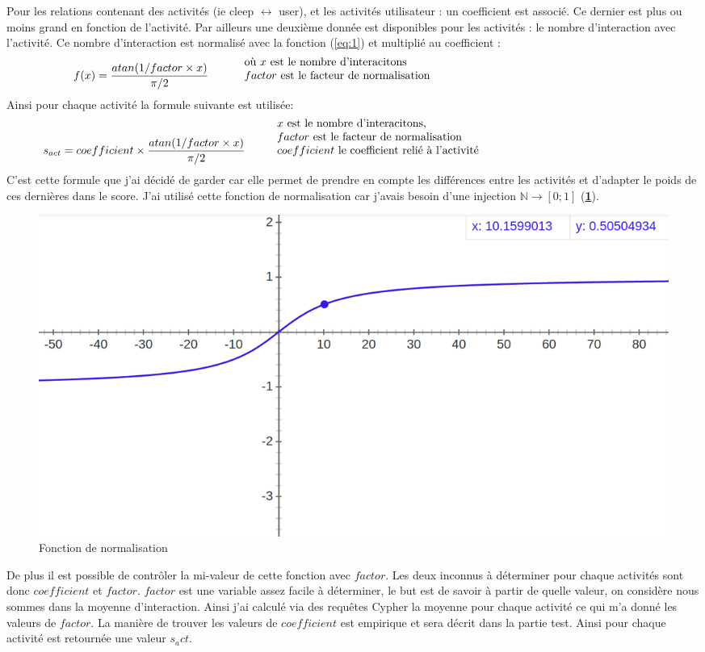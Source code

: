 \documentclass{article} %
\begin{document}
Pour les relations contenant des activités (ie cleep $\leftrightarrow$ user), et les activités utilisateur : un coefficient est associé. Ce dernier est plus ou moins grand en fonction de l'activité. Par ailleurs une deuxième donnée est disponibles pour les activités : le nombre d'interaction avec l'activité. Ce nombre d'interaction est normalisé avec la fonction (\ref{eq:1}) et multiplié au coefficient :
\begin{equation}
\label{eq:1}
f(x) = \frac{atan(1/factor \times x)}{\pi/2} \hspace{1cm} \mbox{ \vbox{\noindent où $x$ est le nombre d'interacitons \\$factor$ est le facteur de normalisation }}
\end{equation}
Ainsi pour chaque activité la formule suivante est utilisée:
\begin{equation}
\label{eq:2}
s_{act} = coefficient\times\frac{atan(1/factor \times x)}{\pi/2} \hspace{1cm} \mbox{\vbox{\noindent $x$ est le nombre d'interacitons, \\$factor$ est le facteur de  normalisation \\ $coefficient$ le coefficient relié à l'activité}} 
\end{equation}
C'est cette formule que j'ai décidé de garder car elle permet de prendre en compte les différences entre les activités et d'adapter le poids de ces dernières dans le score. J'ai utilisé cette fonction de normalisation car j'avais besoin d'une injection $\mathbb{N} \rightarrow [0;1]$ (\textbf{\ref{fig:atan}}). 
\begin{figure}[!h]
	\centering
	\includegraphics[keepaspectratio = true,scale=0.3]{atan.png}
	\caption{Fonction de normalisation}
	\label{fig:atan}
\end{figure}

De plus il est possible de contrôler la mi-valeur de cette fonction avec $factor$. Les deux inconnus à déterminer pour chaque activités sont donc $coefficient$ et $factor$. $factor$ est une variable assez facile à déterminer, le but est de savoir à partir de quelle valeur, on considère nous sommes dans la moyenne d'interaction. Ainsi j'ai calculé via des requêtes Cypher la moyenne pour chaque activité ce qui m'a donné les valeurs de $factor$. La manière de trouver les valeurs de $coefficient$ est empirique et sera décrit dans la partie test. Ainsi pour chaque activité est retournée une valeur $s_act$.\\
\end{document}
